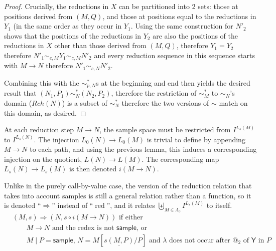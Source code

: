 \documentclass{article}
\newcommand{\tY}{\textsf{Y}}
\newcommand{\tsample}{\textsf{sample}}
\DeclareMathOperator{\red}{red}
\theoremstyle{definition}
\theoremstyle{lemma}
\theoremstyle{remark}
\begin{document}
\begin{proof}
Crucially, the reductions in $X$ can be partitioned into 2 sets: those at positions derived from $(M,Q)$, and those at positions equal to the reductions in $Y_1$ (in the same order as they occur in $Y_1$. Using the same construction for $N'_2$ shows that the positions of the reductions in $Y_2$ are also the positions of the reductions in $X$ other than those derived from $(M,Q)$, therefore $Y_1 = Y_2$ therefore $N'_1 \sim_{c,M} Y_1 \sim_{c,M} N'_2$ and every reduction sequence in this sequence starts with $M \to N$ therefore $N'_1 \sim_{c,N} N'_2$.

Combining this with the $\sim_{p,N}^*$s at the beginning and end then yields the desired result that $(N_1,P_1) \sim_N^* (N_2, P_2)$, therefore the restriction of $\sim_M^*$ to $\sim_N$'s domain ($Rch(N)$) is a subset of $\sim_N^*$ therefore the two versions of $\sim$ match on this domain, as desired.
\end{proof}


At each reduction step $M \to N$, the sample space must be restricted from $I^{L_s(M)}$ to $I^{L_s(N)}$. The injection $L_0(N) \to L_0(M)$ is trivial to define by appending $M \to N$ to each path, and using the previous lemma, this induces a corresponding injection on the quotient, $L(N) \to L(M)$. The corresponding map $L_s(N) \to L_s(M)$ is then denoted $i(M \to N)$.

Unlike in the purely call-by-value case, the version of the reduction relation that takes into account samples is still a general relation rather than a function, so it is denoted ``$\Rightarrow$'' instead of ``$\red$'', and it relates $\biguplus_{M \in \Lambda_0} I^{L_s(M)}$ to itself.
\begin{align*}
& (M,s) \Rightarrow (N,s \circ i(M \to N)) \text{ if either} \\
& \qquad \text{$M \to N$ and the redex is not $\tsample$, or} \\
& \qquad \text{$M \mid P = \tsample$, $N = M[\underline{s(M,P)}/P]$ and $\lambda$ does not occur after $@_2$ of $\tY$ in $P$}
\end{align*}
\end{document}
